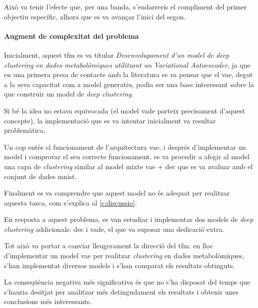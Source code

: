 \documentclass[CAT,BIB]{TFUOC}%
\begin{document}
            Això va tenir l'efecte que,
            per una banda,
            s'endarrerís el compliment del primer objectiu específic,
            alhora que es va avançar l'inici del segon.

        \paragraph{Augment de complexitat del problema}
            Inicialment,
            aquest \gls{tfm} es va titular
            \textit{Desenvolupament d’un model de \textit{deep clustering}
            en dades metabolòmiques
            utilitzant un Variational Autoencoder},
            ja que en una primera presa de contacte amb la literatura
            es va pensar que el \gls{vae},
            degut a la seva capacitat com a model generatiu,
            podia ser una base interessant
            sobre la que construir un model de \textit{deep clustering}.

            Si bé la idea no estava equivocada
            (el model \gls{vade} parteix precisament d'aquest concepte),
            la implementació que es va intentar inicialment
            va resultar problemàtica.

            Un cop entès el funcionament de l'arquitectura \gls{vae},
            i després d'implementar un model i comprovar el seu correcte funcionament,
            es va procedir a afegir al model una capa de \textit{clustering}
            similar al model mixte \gls{vae} + \gls{dec}
            que es va avaluar amb el conjunt de dades \gls{mnist}.

            Finalment es va comprendre que aquest model
            no és adequat per realitzar aquesta tasca,
            com s'explica al \cref{c:discussio}.

            En resposta a aquest problema,
            es van estudiar i implementar dos models de \textit{deep clustering}
            addicionals: \gls{dec} i \gls{vade},
            el que va suposar una dedicació extra.

            Tot això va portar a canviar lleugerament
            la direcció del \gls{tfm}:
            en lloc d'implementar un model \gls{vae}
            per realitzar \textit{clustering}
            en dades metabolòmiques,
            s'han implementat diversos models i s'han comparat els resultats obtinguts.

            La conseqüència negativa més significativa
            és que no s'ha disposat del temps que s'hauria desitjat
            per analitzar més detingudament els resultats
            i obtenir unes conclusions més interessants.
\end{document}
